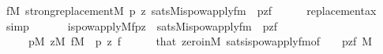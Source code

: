 \begin{isabellebody}
\ {\isachardoublequoteopen}{\isasymforall}f{}{\isasymin}M{\isachardot}{\kern0pt}\ strong{\isacharunderscore}{\kern0pt}replacement{\isacharparenleft}{\kern0pt}{\isacharhash}{\kern0pt}{\isacharhash}{\kern0pt}M{\isacharcomma}{\kern0pt}\ {\isasymlambda}p\ z{\isachardot}{\kern0pt}\ sats{\isacharparenleft}{\kern0pt}M{\isacharcomma}{\kern0pt}is{\isacharunderscore}{\kern0pt}powapply{\isacharunderscore}{\kern0pt}fm{\isacharparenleft}{\kern0pt}{}{\isacharcomma}{\kern0pt}{}{\isacharcomma}{\kern0pt}{}{\isacharparenright}{\kern0pt}\ {\isacharcomma}{\kern0pt}\ {\isacharbrackleft}{\kern0pt}p{\isacharcomma}{\kern0pt}z{\isacharcomma}{\kern0pt}f{}{\isacharbrackright}{\kern0pt}{\isacharparenright}{\kern0pt}{\isacharparenright}{\kern0pt}{\isachardoublequoteclose}\isanewline
\ \ \ \ \isamarkupfalse%
\ replacement{\isacharunderscore}{\kern0pt}ax\ \isamarkupfalse%
\ simp\isanewline
\ \ \isamarkupfalse%
\isanewline
\ \ \isamarkupfalse%
\ {\isachardoublequoteopen}is{\isacharunderscore}{\kern0pt}powapply{\isacharparenleft}{\kern0pt}{\isacharhash}{\kern0pt}{\isacharhash}{\kern0pt}M{\isacharcomma}{\kern0pt}f{}{\isacharcomma}{\kern0pt}p{\isacharcomma}{\kern0pt}z{\isacharparenright}{\kern0pt}\ {\isasymlongleftrightarrow}\ sats{\isacharparenleft}{\kern0pt}M{\isacharcomma}{\kern0pt}is{\isacharunderscore}{\kern0pt}powapply{\isacharunderscore}{\kern0pt}fm{\isacharparenleft}{\kern0pt}{}{\isacharcomma}{\kern0pt}{}{\isacharcomma}{\kern0pt}{}{\isacharparenright}{\kern0pt}\ {\isacharcomma}{\kern0pt}\ {\isacharbrackleft}{\kern0pt}p{\isacharcomma}{\kern0pt}z{\isacharcomma}{\kern0pt}f{}{\isacharbrackright}{\kern0pt}{\isacharparenright}{\kern0pt}{\isachardoublequoteclose}\isanewline
\ \ \ \ \ {\isachardoublequoteopen}p{\isasymin}M{\isachardoublequoteclose}\ {\isachardoublequoteopen}z{\isasymin}M{\isachardoublequoteclose}\ {\isachardoublequoteopen}f{}{\isasymin}M{\isachardoublequoteclose}\ \ p\ z\ f{}\isanewline
\ \ \ \ \isamarkupfalse%
\ that\ zero{\isacharunderscore}{\kern0pt}in{\isacharunderscore}{\kern0pt}M\ sats{\isacharunderscore}{\kern0pt}is{\isacharunderscore}{\kern0pt}powapply{\isacharunderscore}{\kern0pt}fm{\isacharbrackleft}{\kern0pt}of\ {}\ {}\ {}\ {\isachardoublequoteopen}{\isacharbrackleft}{\kern0pt}p{\isacharcomma}{\kern0pt}z{\isacharcomma}{\kern0pt}f{}{\isacharbrackright}{\kern0pt}{\isachardoublequoteclose}\ M{\isacharbrackright}{\kern0pt}\ \isamarkupfalse%

\end{isabellebody}
